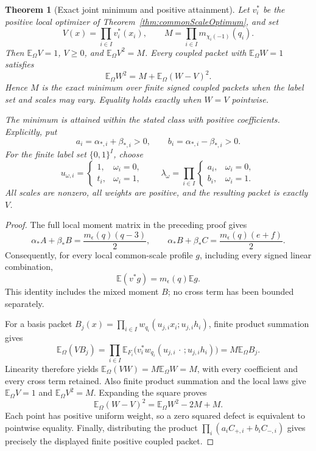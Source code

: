 \documentclass[11pt]{article}
\newtheorem{theorem}{Theorem}[section]
\begin{document}
\begin{theorem}[Exact joint minimum and positive attainment]
\label{thm:jointCommonScaleOptimum}
Let \(v_i^*\) be the positive local optimizer of
Theorem~\ref{thm:commonScaleOptimum}, and set
\[
 V(x)=\prod_{i\in I}v_i^*(x_i),\qquad
 M=\prod_{i\in I}m_{\chi_i(-1)}(q_i).
\]
Then \(\mathbb E_\Omega V=1\), \(V\ge0\), and
\(\mathbb E_\Omega V^2=M\).
Every coupled packet with \(\mathbb E_\Omega W=1\) satisfies
\[
 \boxed{\quad
 \mathbb E_\Omega W^2
   =M+\mathbb E_\Omega(W-V)^2.
 \quad}
\]
Hence \(M\) is the exact minimum over finite signed coupled packets
when the label set and scales may vary. Equality holds exactly when
\(W=V\) pointwise.

The minimum is attained within the stated class with positive
coefficients. Explicitly, put
\[
 a_i=\alpha_{*,i}+\beta_{*,i}>0,\qquad
 b_i=\alpha_{*,i}-\beta_{*,i}>0.
\]
For the finite label set \(\{0,1\}^I\), choose
\[
 u_{\omega,i}=
 \begin{cases}1,&\omega_i=0,\\t_i,&\omega_i=1,\end{cases}
 \qquad
 \lambda_\omega=\prod_{i\in I}
 \begin{cases}a_i,&\omega_i=0,\\b_i,&\omega_i=1.\end{cases}
\]
All scales are nonzero, all weights are positive, and the resulting
packet is exactly \(V\).
\end{theorem}

\begin{proof}
The full local moment matrix in the preceding proof gives
\[
 \alpha_*A+\beta_*B=\frac{m_\epsilon(q)(q-3)}2,\qquad
 \alpha_*B+\beta_*C=\frac{m_\epsilon(q)(e+f)}2.
\]
Consequently, for every local common-scale profile \(g\),
including every signed linear combination,
\[
                \mathbb E(v^*g)=m_\epsilon(q)\mathbb E g.
\]
This identity includes the mixed moment \(B\); no cross term has
been bounded separately.

For a basis packet
\(B_j(x)=\prod_{i\in I}w_{q_i}(u_{j,i}x_i;u_{j,i}h_i)\),
finite product summation gives
\[
 \mathbb E_\Omega(VB_j)
  =\prod_{i\in I}\mathbb E_{F_i}
       \bigl(v_i^*w_{q_i}(u_{j,i}\,\cdot\,;u_{j,i}h_i)\bigr)
  =M\mathbb E_\Omega B_j.
\]
Linearity therefore yields
\(\mathbb E_\Omega(VW)=M\mathbb E_\Omega W=M\), with every
coefficient and every cross term retained.
Also finite product summation and the local laws give
\(\mathbb E_\Omega V=1\) and \(\mathbb E_\Omega V^2=M\).
Expanding the square proves
\[
 \mathbb E_\Omega(W-V)^2
    =\mathbb E_\Omega W^2-2M+M.
\]
Each point has positive uniform weight, so a zero squared
defect is equivalent to pointwise equality.
Finally, distributing the product
\(\prod_i(a_iC_{+,i}+b_iC_{-,i})\) gives precisely the displayed
finite positive coupled packet.
\end{proof}
\end{document}
